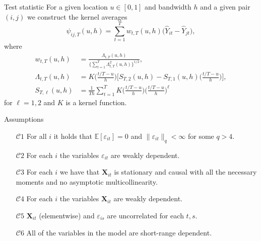 \documentclass[10pt, handout]{beamer}
\newcommand{\E}{\mathbb{E}}
\newcommand{\X}{\boldsymbol{X}}
\begin{document}
\begin{frame}{Test statistic}
For a given location $u \in [0,1]$ and bandwidth $h$ and a given pair $(i, j)$ we construct the kernel averages
\begin{equation*}
\widehat{\psi}_{ij, T}(u,h) = \sum\limits_{t=1}^T w_{t,T}(u,h) \big(\widehat{Y}_{it} - \widehat{Y}_{jt}), 
\end{equation*}
\vspace{-3mm}
where 
\begin{align*}
w_{t,T}(u,h) &= \frac{\Lambda_{t,T}(u,h)}{ \{\sum\nolimits_{t=1}^T \Lambda_{t,T}^2(u,h)\}^{1/2} } ,\\
\Lambda_{t,T}(u,h) &= K\Big(\frac{t/T-u}{h}\Big) \Big[ S_{T,2}(u,h)  - S_{T,1}(u,h)\Big(\frac{t/T-u}{h}\Big) \Big], \\
S_{T,\ell}(u,h) &= \frac{1}{Th} \sum\nolimits_{t=1}^T K\Big(\frac{t/T-u}{h}\Big) \Big(\frac{t/T-u}{h}\Big)^\ell
\end{align*}
for $\ell = 1,2$ and $K$ is a kernel function.
\end{frame}

\begin{frame}[label = frame_assumptions]{Assumptions}
\begin{itemize}

\item[$\mathcal{C}1$] \label{C-err1} For all $i$ it holds that $\E[\varepsilon_{it}] =0$ and $\| \varepsilon_{it} \|_q < \infty$ for some $q > 4$.\pause
\item[$\mathcal{C}2$] For each $i$ the variables $\varepsilon_{it}$ are weakly dependent. \hyperlink{tech_assumptions}{}\pause

\item[$\mathcal{C}3$] \label{C-reg} For each $i$ we have that $\X_{it}$ is stationary and causal with all the necessary moments and no asymptotic multicollinearity.\pause

\item[$\mathcal{C}4$] For each $i$ the variables $\X_{it}$ are weakly dependent. \hyperlink{tech_assumptions_2}{}\pause
\item[$\mathcal{C}5$]  $\X_{it}$ (elementwise) and $\varepsilon_{is}$ are uncorrelated for each $t, s$.\pause

\item[$\mathcal{C}6$] All of the variables in the model are short-range dependent.\hyperlink{tech_assumptions_3}{}

\end{itemize}
\end{frame}
\end{document}
